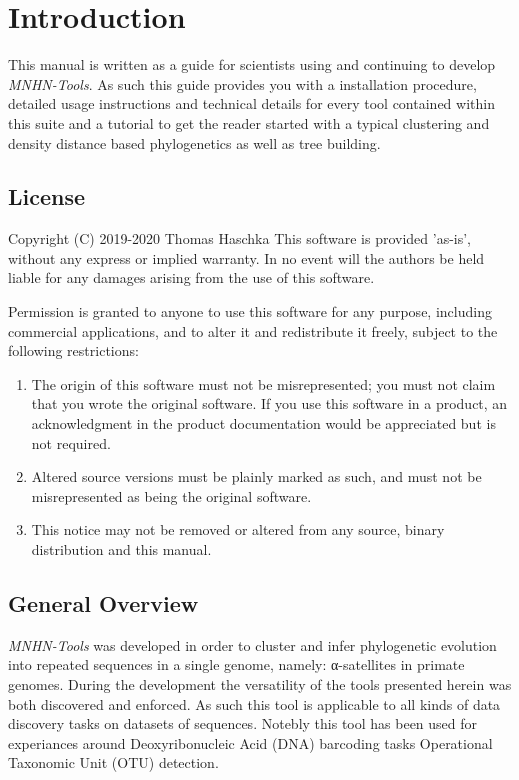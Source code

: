 \chapter{Introduction}

This manual is written as a guide for scientists using and continuing to
develop \emph{MNHN-Tools}. As such this guide provides you with a
installation procedure, detailed usage instructions and technical
details for every tool contained within this suite and a tutorial to get
the reader started with a typical clustering and density distance
based phylogenetics as well as tree building.

\section{License}
Copyright (C) 2019-2020 Thomas Haschka \newline
This software is provided 'as-is', without any express or implied
warranty.  In no event will the authors be held liable for any damages
arising from the use of this software.

Permission is granted to anyone to use this software for any purpose,
including commercial applications, and to alter it and redistribute it
freely, subject to the following restrictions:

\begin{enumerate}
  \item The origin of this software must not be misrepresented; you must not
    claim that you wrote the original software. If you use this software
   in a product, an acknowledgment in the product documentation would be
   appreciated but is not required.
  \item Altered source versions must be plainly marked as such, and must not be
    misrepresented as being the original software.
  \item This notice may not be removed or altered from any source,
    binary distribution and this manual.
\end{enumerate}

\section{General Overview}

\emph{MNHN-Tools} was developed in order to cluster and infer
phylogenetic evolution into repeated sequences in a single genome,
namely: α-satellites in primate genomes. During the development
the versatility of the tools presented herein was both discovered and
enforced. As such this tool is applicable to all kinds of data
discovery tasks on datasets of sequences. Notebly this tool has been
used for experiances around Deoxyribonucleic Acid (DNA) barcoding tasks
Operational Taxonomic Unit (OTU) detection.

